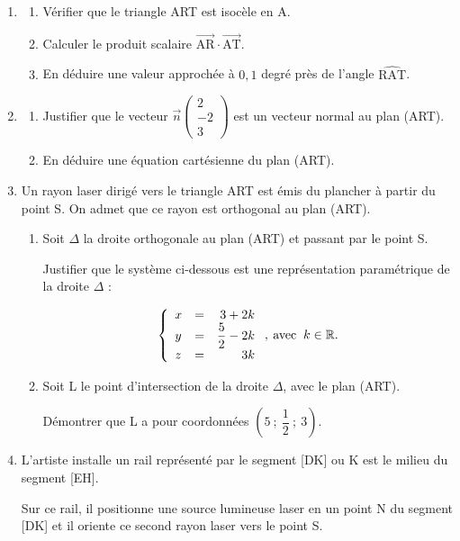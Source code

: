 \documentclass[10pt]{article}
\providecommand{\R}{\mathbb{R}}
\providecommand{\vect}[1]{\overrightarrow{#1}}
\begin{document}
\begin{enumerate}
\item 
	\begin{enumerate}
		\item Vérifier que le triangle ART est isocèle en A.
		\item Calculer le produit scalaire $\vect{\text{AR}} \cdot \vect{\text{AT}}$.
		\item En déduire une valeur approchée à $0,1$ degré près de l'angle $\widehat{\text{RAT}}$.
	\end{enumerate}
\item 
	\begin{enumerate}
		\item Justifier que le vecteur $\vect{n}\begin{pmatrix}2\\-2\\3\end{pmatrix}$ est un vecteur normal au plan (ART).
		\item En déduire une équation cartésienne du plan (ART).
	\end{enumerate}
\item Un rayon laser dirigé vers le triangle ART est émis du plancher à partir du point S. On admet que ce rayon est orthogonal au plan (ART).
	\begin{enumerate}
		\item Soit $\Delta$ la droite orthogonale au plan (ART) et passant par le point S.
		
Justifier que le système ci-dessous est une représentation paramétrique de la droite $\Delta$ :

\[\left\{\begin{array}{l c r}
x&=&3+2k\\
y&=& \dfrac52 - 2k\\
z &=& 3k
\end{array}\right.,\: \text{avec }\:k \in \R.\]

		\item Soit L le point d'intersection de la droite $\Delta$, avec le plan (ART).

Démontrer que L a pour coordonnées $\left(5~;~\dfrac12~;~3\right)$.
	\end{enumerate}
\item L'artiste installe un rail représenté  par le segment  [DK] ou K est le milieu du segment [EH].

Sur ce rail, il positionne une source lumineuse laser en un point N du segment [DK] et il oriente ce
second rayon laser vers le point S.


\end{enumerate}
\end{document}
